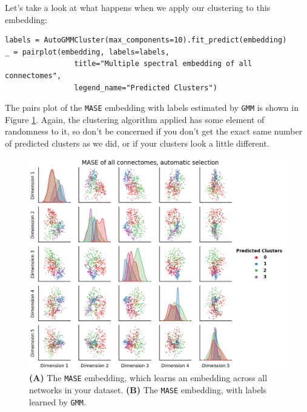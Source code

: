 Let's take a look at what happens when we apply our clustering to this embedding:

\begin{lstlisting}[style=python]
labels = AutoGMMCluster(max_components=10).fit_predict(embedding)
_ = pairplot(embedding, labels=labels,
                title="Multiple spectral embedding of all connectomes", 
                legend_name="Predicted Clusters")
\end{lstlisting}
The pairs plot of the \texttt{MASE} embedding with labels estimated by \texttt{GMM} is shown in Figure \ref{fig:ch2:mase}. Again, the clustering algorithm applied has some element of randomness to it, so don't be concerned if you don't get the exact same number of predicted clusters as we did, or if your clusters look a little different.

\begin{figure}[h]
    \centering
    \includegraphics[width=\linewidth]{foundations/ch2/Images/mase.png}
    \caption[Joint embedding with estimated labels for connectomes]{\textbf{(A)} The \texttt{MASE} embedding, which learns an embedding across all networks in your dataset. \textbf{(B)} The \texttt{MASE} embedding, with labels learned by \texttt{GMM}.}
    \label{fig:ch2:mase}
\end{figure}
\newpage